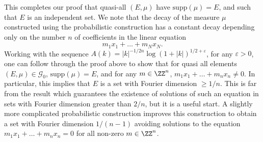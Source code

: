 This completes our proof that quasi-all $(E,\mu)$ have $\text{supp}(\mu) = E$, and such that $E$ is an independent set. We note that the decay of the measure $\mu$ constructed using the probabilistic construction has a constant decay depending only on the number $n$ of coefficients in the linear equation
%
\[ m_1 x_1 + \dots + m_N x_N. \]
%
Working with the sequence $A(k) = |k|^{-1/2n} \log(1 + |k|)^{1/2 + \varepsilon}$, for any $\varepsilon > 0$, one can follow through the proof above to show that for quasi all elements $(E,\mu) \in \mathcal{G}_0$, $\text{supp}(\mu) = E$, and for any $m \in \ZZ^n$, $m_1 x_1 + \dots + m_n x_n \neq 0$. In particular, this implies that $E$ is a set with Fourier dimension $\geq 1/n$. This is far from the result which guarantees the existence of solutions of such an equation in sets with Fourier dimension greater than $2/n$, but it is a useful start. A slightly more complicated probabilistic construction improves this construction to obtain a set with Fourier dimension $1/(n-1)$ avoiding solutions to the equation $m_1 x_1 + \dots + m_n x_n = 0$ for all non-zero $m \in \ZZ^n$.

